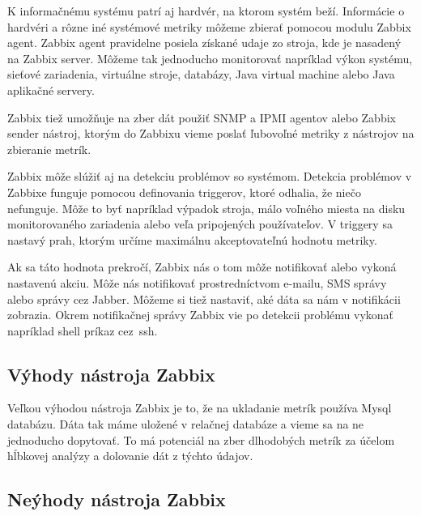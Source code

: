 \documentclass[a4paper, upjsfrontpage, thesismargins, thesislinespacing]{rnthesis}
\begin{document}
K informačnému systému patrí aj hardvér, na ktorom systém beží.
Informácie o hardvéri a rôzne iné systémové metriky môžeme zbierať pomocou modulu Zabbix agent.
Zabbix agent pravidelne posiela získané udaje zo stroja, kde je nasadený na Zabbix server.
Môžeme tak jednoducho monitorovať napríklad výkon systému, sieťové zariadenia, virtuálne stroje, databázy, Java virtual machine alebo Java aplikačné servery.

Zabbix tiež umožňuje na zber dát použiť SNMP a IPMI agentov alebo Zabbix sender nástroj, ktorým do Zabbixu vieme poslať ľubovoľné metriky z nástrojov na zbieranie metrík.

Zabbix môže slúžiť aj na detekciu problémov so systémom.
Detekcia problémov v Zabbixe funguje pomocou definovania triggerov, ktoré odhalia, že niečo nefunguje.
Môže to byť napríklad výpadok stroja, málo voľného miesta na disku monitorovaného zariadenia alebo veľa pripojených používateľov.
V triggery sa nastavý prah, ktorým určíme maximálnu akceptovateľnú hodnotu metriky.

Ak sa táto hodnota prekročí, Zabbix nás o tom môže notifikovať alebo vykoná nastavenú akciu.
Môže nás notifikovať prostredníctvom e-mailu, SMS správy alebo správy cez Jabber.
Môžeme si tiež nastaviť, aké dáta sa nám v notifikácii zobrazia.
Okrem notifikačnej správy Zabbix vie po detekcii problému vykonať napríklad shell príkaz cez~ssh.

\subsection{Výhody nástroja Zabbix}

Veľkou výhodou nástroja Zabbix je to, že na ukladanie metrík používa Mysql databázu.
Dáta tak máme uložené v relačnej databáze a vieme sa na ne jednoducho dopytovať.
To má potenciál na zber dlhodobých metrík za účelom hĺbkovej analýzy a dolovanie dát z týchto údajov.


\subsection{Neýhody nástroja Zabbix}
\end{document}
